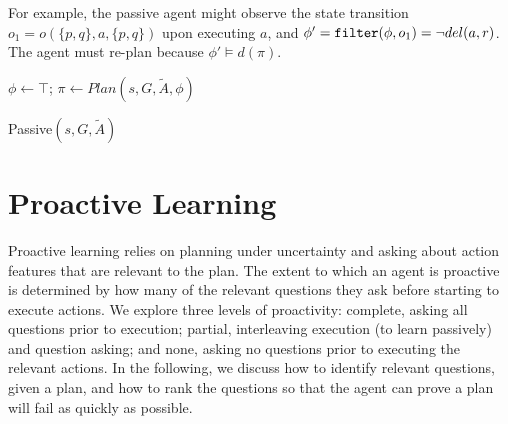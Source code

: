 \documentclass[letterpaper]{article}
\def\goalie{{\tt Goalie}}
\begin{document}
For example, the passive agent might observe the state transition $o_1
= o(\{p,q\}, a, \{p,q\})$ upon executing $a$, and $\phi' = {\tt filter}(\phi,
o_1) = \neg del(a, r)$.  The agent must re-plan because $\phi' \models d(\pi)$.


\begin{algorithm}[t]
\SetLine
{}
 $\phi \leftarrow \top$; $\pi \leftarrow Plan(s, G, \tilde{A}, \phi)$\;
\caption{Passive$(s, G, \tilde{A})$}\label{alg:replan}
\end{algorithm}



\section{Proactive Learning}


Proactive learning relies on planning under uncertainty and asking about action
features that are relevant to the plan.  The extent to which an agent is
proactive is determined by how many of the relevant questions they ask before
starting to execute actions.  We explore three levels of proactivity: complete,
asking all questions prior to execution; partial, interleaving execution (to
learn passively) and question asking; and none, asking no questions prior to
executing the relevant actions.  In the following, we discuss how to identify
relevant questions, given a plan, and how to rank the questions so that the
agent can prove a plan will fail as quickly as possible.
\end{document}
